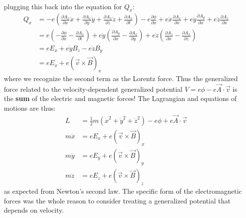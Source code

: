 \begin{example}{0pt}
\begin{align*}
\end{align*}
plugging this back into the equation for $Q_x$:
\begin{align*}
Q_x&=-e\left(\frac{\partial A_x}{\partial x}\dot{x}+\frac{\partial A_x}{\partial y}\dot{y}+\frac{\partial A_x}{\partial z}\dot{z}+\frac{\partial A_x}{\partial t}\right) - e\frac{\partial\phi} {\partial x}+e\dot{x}\frac{\partial A_x}{\partial x}+e\dot{y}\frac{\partial A_y}{\partial x}+e\dot{z}\frac{\partial A_z}{\partial x}\\
&=e\left(-\frac{\partial\phi}{\partial x}-\frac{\partial A_x}{\partial t}\right)+e\dot{y}(\frac{\partial A_y}{\partial x}-\frac{\partial A_x}{\partial y})+e\dot{z}(\frac{\partial A_z}{\partial x}-\frac{\partial A_x}{\partial z})\\
&=eE_x+e\dot{y}B_z-e\dot{z}B_y\\
&=eE_x+e(\vec{v}\times\vec{B})_x
\end{align*}
where we recognize the second term as the Lorentz force. Thus the generalized force related to the velocity-dependent generalized potential $V=e\phi -e\vec{A}\cdot\vec{v}$ is the \textbf{sum} of the electric and magnetic forces! The Lagrangian and equations of motions are thus:
\begin{align*}
L&=\frac{1}{2}m(\dot{x}^2+\dot{y}^2+\dot{z}^2)-e\phi+e\vec{A}\cdot\vec{v}\\
m\ddot{x}&=eE_x+e(\vec{v}\times\vec{B})_x\\
m\ddot{y}&=eE_y+e(\vec{v}\times\vec{B})_y\\
m\ddot{z}&=eE_z+e(\vec{v}\times\vec{B})_z
\end{align*}
as expected from Newton's second law. The specific form of the electromagnetic forces was the whole reason to consider treating a generalized potential that depends on velocity.
\end{example}

